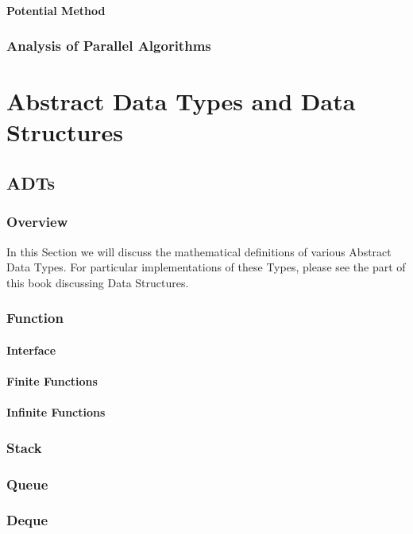 \documentclass[12pt, letterpaper]{book}
\begin{document}
		\subsection{Potential Method}

	\section{Analysis of Parallel Algorithms} \label{parallel analysis}

\part{Abstract Data Types and Data Structures}

\chapter{ADTs} \label{ADTs}

	\section{Overview}

	In this Section we will discuss the mathematical definitions of various Abstract Data Types. For particular implementations of these Types, please see the part of this book discussing Data Structures.

\section{Function}
	\subsection{Interface}
	\subsection{Finite Functions}

	\subsection{Infinite Functions}
\section{Stack}
\section{Queue}
\section{Deque}
\end{document}
